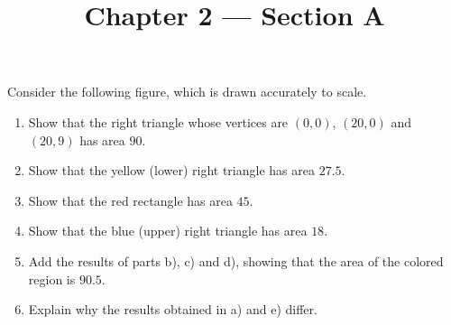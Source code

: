 \documentclass[11pt, a4paper, tikz]{article}
\newcommand{\centsection}[1]{
	\section*{\centering{#1}}
}
\begin{document}
	\title{\textbf{Chapter 2 — Section A}}
	\maketitle
	\centsection{Exercise 14}
	
	\begin{formulationBox}
		Consider the following figure, which is drawn accurately to scale.
		
		
		\begin{enumerate}[label=\alph*)]
			\item Show that the right triangle whose vertices are $(0,0)$, $(20, 0)$ and $(20, 9)$ has area $90$.
			\item Show that the yellow (lower) right triangle has area $27.5$.
			\item Show that the red rectangle has area $45$.
			\item Show that the blue (upper) right triangle has area $18$.
			\item Add the results of parts b), c) and d), showing that the area of the colored region is $90.5$.
			\item Explain why the results obtained in a) and e) differ.
		\end{enumerate}
	\end{formulationBox}
\end{document}
